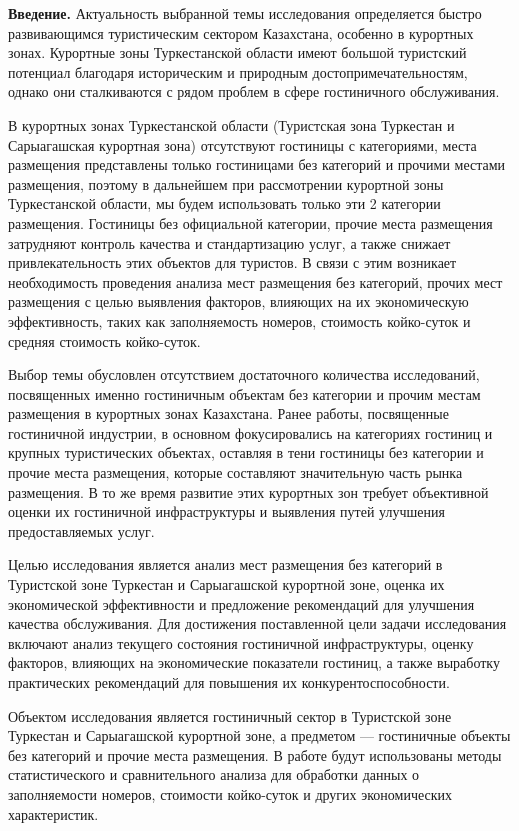{\bfseries Введение.} Актуальность выбранной темы исследования определяется
быстро развивающимся туристическим сектором Казахстана, особенно в
курортных зонах. Курортные зоны Туркестанской области имеют большой
туристский потенциал благодаря историческим и природным
достопримечательностям, однако они сталкиваются с рядом проблем в сфере
гостиничного обслуживания.

В курортных зонах Туркестанской области (Туристская зона Туркестан и
Сарыагашская курортная зона) отсутствуют гостиницы с категориями, места
размещения представлены только гостиницами без категорий и прочими
местами размещения, поэтому в дальнейшем при рассмотрении курортной зоны
Туркестанской области, мы будем использовать только эти 2 категории
размещения. Гостиницы без официальной категории, прочие места размещения
затрудняют контроль качества и стандартизацию услуг, а также снижает
привлекательность этих объектов для туристов. В связи с этим возникает
необходимость проведения анализа мест размещения без категорий, прочих
мест размещения с целью выявления факторов, влияющих на их экономическую
эффективность, таких как заполняемость номеров, стоимость койко-суток и
средняя стоимость койко-суток.

Выбор темы обусловлен отсутствием достаточного количества исследований,
посвященных именно гостиничным объектам без категории и прочим местам
размещения в курортных зонах Казахстана. Ранее работы, посвященные
гостиничной индустрии, в основном фокусировались на категориях гостиниц
и крупных туристических объектах, оставляя в тени гостиницы без
категории и прочие места размещения, которые составляют значительную
часть рынка размещения. В то же время развитие этих курортных зон
требует объективной оценки их гостиничной инфраструктуры и выявления
путей улучшения предоставляемых услуг.

Целью исследования является анализ мест размещения без категорий в
Туристской зоне Туркестан и Сарыагашской курортной зоне, оценка их
экономической эффективности и предложение рекомендаций для улучшения
качества обслуживания. Для достижения поставленной цели задачи
исследования включают анализ текущего состояния гостиничной
инфраструктуры, оценку факторов, влияющих на экономические показатели
гостиниц, а также выработку практических рекомендаций для повышения их
конкурентоспособности.

Объектом исследования является гостиничный сектор в Туристской зоне
Туркестан и Сарыагашской курортной зоне, а предметом --- гостиничные
объекты без категорий и прочие места размещения. В работе будут
использованы методы статистического и сравнительного анализа для
обработки данных о заполняемости номеров, стоимости койко-суток и других
экономических характеристик.

